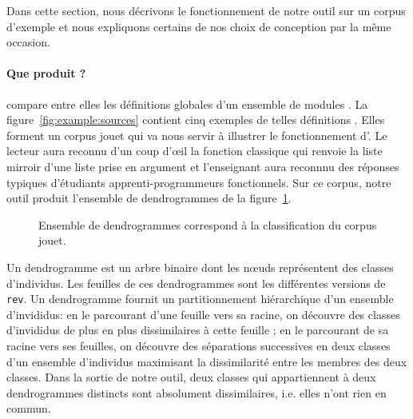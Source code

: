 Dans cette section, nous décrivons le fonctionnement de notre outil
sur un corpus d'exemple et nous expliquons certains de nos choix de
conception par la même occasion.



\paragraph{Que produit {\Asak}?}
{\Asak} compare entre elles les définitions globales d'un ensemble de
modules {\OCaml}. La figure~\ref{fig:example:sources} contient cinq
exemples de telles définitions {\OCaml}. Elles forment un corpus jouet
qui va nous servir à illustrer le fonctionnement d'{\Asak}.  Le
lecteur aura reconnu d'un coup d'{\oe}il la fonction classique qui
renvoie la liste mirroir d'une liste prise en argument et l'enseignant
aura reconnnu des réponses typiques d'étudiants apprenti-programmeurs
fonctionnels. Sur ce corpus, notre outil produit l'ensemble de
dendrogrammes de la figure~\ref{fig:toy-classes}.

\begin{figure}
\begin{center}
\end{center}
\caption{Ensemble de dendrogrammes correspond à la classification du corpus jouet.}
\label{fig:toy-classes}
\end{figure}

Un dendrogramme est un arbre binaire dont les n{\oe}uds représentent
des classes d'individus. Les feuilles de ces dendrogrammes sont les
différentes versions de \texttt{rev}. Un dendrogramme fournit un
partitionnement hiérarchique d'un ensemble d'invididus: en le
parcourant d'une feuille vers sa racine, on découvre des classes
d'invididus de plus en plus dissimilaires à cette feuille ; en le
parcourant de sa racine vers ses feuilles, on découvre des séparations
successives en deux classes d'un ensemble d'individus maximisant la
dissimilarité entre les membres des deux classes. Dans la sortie
de notre outil, deux classes qui appartiennent à deux dendrogrammes
distincts sont absolument dissimilaires, i.e. elles n'ont rien en
commun.

